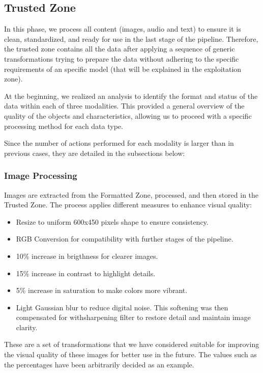\documentclass[12pt]{article}
\begin{document}
\subsection{Trusted Zone}
In this phase, we process all content (images, audio and text) to ensure it is clean, standardized, and ready for use in the last stage of the pipeline. Therefore, the trusted zone contains all the data after applying a sequence of generic transformations trying to prepare the data without adhering to the specific requirements of an specific model (that will be explained in the exploitation zone). 

At the beginning, we realized an analysis to identify the format and status of the data within each of three modalities. This provided a general overview of the quality of the objects and characteristics, allowing us to proceed with a specific processing method for each data type.

Since the number of actions performed for each modality is larger than in previous cases, they are detailed in the subsections below:

\subsubsection{Image Processing}
Images are extracted from the Formatted Zone, processed, and then stored in the Trusted Zone. The process applies different measures to enhance visual quality:
\begin{itemize}
    \item Resize to uniform 600x450 pixels shape to ensure consistency.
    \item RGB Conversion for compatibility with further stages of the pipeline.
    \item 10\% increase in brigthness for clearer images.
    \item 15\% increase in contrast to highlight details.
    \item 5\% increase in saturation to make colors more vibrant.
    \item Light Gaussian blur to reduce digital noise. This softening was then compensated for withsharpening filter to restore detail and maintain image clarity.
\end{itemize}

These are a set of transformations that we have considered suitable for improving the visual quality of these images for better use in the future. The values such as the percentages have been arbitrarily decided as an example.
\end{document}
